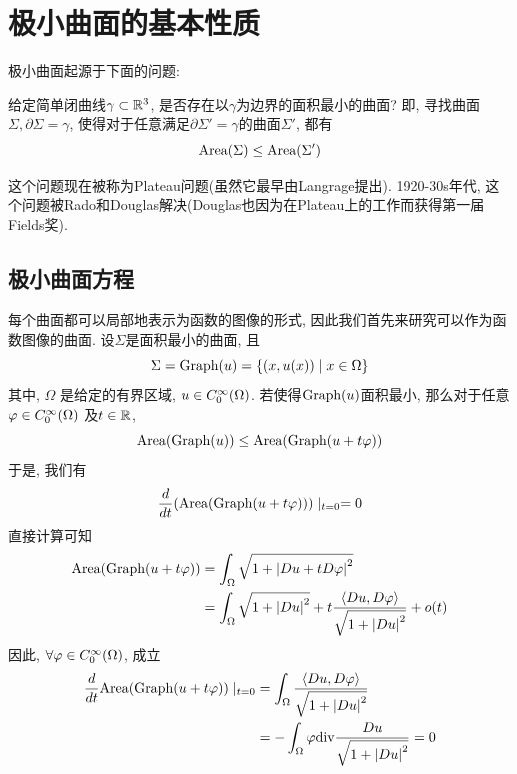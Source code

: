 \chapter{极小曲面的基本性质}
极小曲面起源于下面的问题:
\begin{question*}
    给定简单闭曲线$\gamma \subset \mathbb{R}^3$, 是否存在以$\gamma$为边界的面积最小的曲面? 即, 寻找曲面$\Sigma, \partial \Sigma = \gamma$, 使得对于任意满足$\partial \Sigma' = \gamma$的曲面$\Sigma'$, 都有
    \begin{equation*}
        \text{Area}(\Sigma) \le \text{Area}(\Sigma')
    \end{equation*}
\end{question*}
这个问题现在被称为Plateau问题(虽然它最早由Langrage提出). 1920-30s年代, 这个问题被Rado和Douglas解决(Douglas也因为在Plateau上的工作而获得第一届Fields奖).
\section{极小曲面方程}
每个曲面都可以局部地表示为函数的图像的形式, 因此我们首先来研究可以作为函数图像的曲面. 设$\Sigma$是面积最小的曲面, 且
\begin{equation*}
    \Sigma= \text{Graph}(u)= \{(x,u(x))\mid x \in \Omega\}
\end{equation*}
其中, $\Omega$ 是给定的有界区域, $u \in {C^\infty_0}(\Omega)$. 若使得$\text{Graph}(u)$面积最小, 那么对于任意$\varphi \in {C^\infty_0}(\Omega)$ 及$t \in \mathbb{R}$,
\begin{equation}
    \text{Area}(\text{Graph}(u)) \le \text{Area}(\text{Graph}(u+t\varphi))
\end{equation}
于是, 我们有
\begin{equation}
    \frac{d}{dt}(\text{Area}(\text{Graph}(u+t\varphi)))\mid_ {t=0}=0
\end{equation}
直接计算可知
\begin{equation}
    \begin{split}
        \text{Area}(\text{Graph}(u+t\varphi)) &= \int_\Omega \sqrt{1+\left | Du+tD\varphi \right |^2} \\
                          &= \int_\Omega \sqrt{1+\left | Du \right |^2}+t\frac{{\left < Du, D\varphi \right >}}{\sqrt{1+\left | Du \right |^2}} + o(t)
    \end{split}
\end{equation}
因此, $\forall \varphi \in {C^\infty_0}(\Omega)$, 成立
\begin{equation}
    \begin{split}
        \frac{d}{dt} \text{Area}(\text{Graph}(u+t\varphi))\mid _{t=0} & = \int_\Omega \frac{{\left < Du, D\varphi \right >}}{\sqrt{1+\left | Du \right |^2}} \\
        &=- \int_\Omega \varphi {\text{div}} \frac{Du}{\sqrt{1+\left | Du \right |^2}} =0
    \end{split}
\end{equation}
